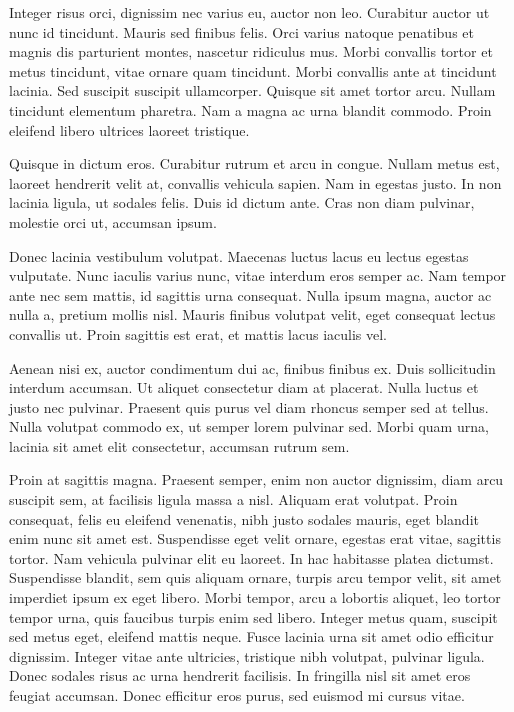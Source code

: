 Integer risus orci, dignissim nec varius eu, auctor non leo. Curabitur auctor ut nunc id tincidunt. Mauris sed finibus felis. Orci varius natoque penatibus et magnis dis parturient montes, nascetur ridiculus mus. Morbi convallis tortor et metus tincidunt, vitae ornare quam tincidunt. Morbi convallis ante at tincidunt lacinia. Sed suscipit suscipit ullamcorper. Quisque sit amet tortor arcu. Nullam tincidunt elementum pharetra. Nam a magna ac urna blandit commodo. Proin eleifend libero ultrices laoreet tristique.

Quisque in dictum eros. Curabitur rutrum et arcu in congue. Nullam metus est, laoreet hendrerit velit at, convallis vehicula sapien. Nam in egestas justo. In non lacinia ligula, ut sodales felis. Duis id dictum ante. Cras non diam pulvinar, molestie orci ut, accumsan ipsum.

Donec lacinia vestibulum volutpat. Maecenas luctus lacus eu lectus egestas vulputate. Nunc iaculis varius nunc, vitae interdum eros semper ac. Nam tempor ante nec sem mattis, id sagittis urna consequat. Nulla ipsum magna, auctor ac nulla a, pretium mollis nisl. Mauris finibus volutpat velit, eget consequat lectus convallis ut. Proin sagittis est erat, et mattis lacus iaculis vel.

Aenean nisi ex, auctor condimentum dui ac, finibus finibus ex. Duis sollicitudin interdum accumsan. Ut aliquet consectetur diam at placerat. Nulla luctus et justo nec pulvinar. Praesent quis purus vel diam rhoncus semper sed at tellus. Nulla volutpat commodo ex, ut semper lorem pulvinar sed. Morbi quam urna, lacinia sit amet elit consectetur, accumsan rutrum sem.

Proin at sagittis magna. Praesent semper, enim non auctor dignissim, diam arcu suscipit sem, at facilisis ligula massa a nisl. Aliquam erat volutpat. Proin consequat, felis eu eleifend venenatis, nibh justo sodales mauris, eget blandit enim nunc sit amet est. Suspendisse eget velit ornare, egestas erat vitae, sagittis tortor. Nam vehicula pulvinar elit eu laoreet. In hac habitasse platea dictumst. Suspendisse blandit, sem quis aliquam ornare, turpis arcu tempor velit, sit amet imperdiet ipsum ex eget libero. Morbi tempor, arcu a lobortis aliquet, leo tortor tempor urna, quis faucibus turpis enim sed libero. Integer metus quam, suscipit sed metus eget, eleifend mattis neque. Fusce lacinia urna sit amet odio efficitur dignissim. Integer vitae ante ultricies, tristique nibh volutpat, pulvinar ligula. Donec sodales risus ac urna hendrerit facilisis. In fringilla nisl sit amet eros feugiat accumsan. Donec efficitur eros purus, sed euismod mi cursus vitae.

